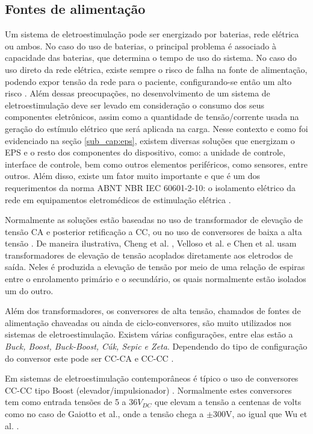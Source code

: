 \subsection{Fontes de alimentação}
Um sistema de eletroestimulação pode ser energizado por baterias, rede elétrica ou ambos. No caso do uso de baterias, o principal problema é associado à capacidade das baterias, que determina o tempo de uso do sistema. No caso do uso direto da rede elétrica, existe sempre o risco de falha na fonte de alimentação, podendo expor tensão da rede para o paciente, configurando-se então um alto risco \cite{Gaiotto2012}. Além dessas preocupações, no desenvolvimento de um sistema de eletroestimulação deve ser levado em consideração o consumo dos seus componentes eletrônicos, assim como a quantidade de tensão/corrente usada na geração do estímulo elétrico que será aplicada na carga. Nesse contexto e como foi evidenciado na seção \ref{sub_cap:eps}, existem diversas soluções que energizam o \acrshort{EPS} e o resto dos componentes do dispositivo, como: a unidade de controle, interface de controle, bem como outros elementos periféricos, como sensores, entre outros. Além disso, existe um fator muito importante e que é um dos requerimentos da norma \acrshort{ABNT} \acrshort{NBR} \acrshort{IEC} 60601-2-10: o isolamento elétrico da rede em equipamentos eletromédicos de estimulação elétrica \cite{Braz2003}. 

Normalmente as soluções estão baseadas no uso de transformador de elevação de tensão \acrshort{CA} e posterior retificação a \acrshort{CC}, ou no uso de conversores de baixa a alta tensão \cite{Cheng2004, KhosravaniSanaz2011, Kaczmarek1991}. De maneira ilustrativa, Cheng et al. \cite{Cheng2004}, Velloso et al. \cite{Velloso2007b} e Chen et al. \cite{Chen2013} usam transformadores de elevação de tensão acoplados diretamente aos eletrodos de saída. Neles é produzida a elevação de tensão por meio de uma relação de espiras entre o enrolamento primário e o secundário, os quais normalmente estão isolados um do outro.

Além dos transformadores, os conversores de alta tensão, chamados de fontes de alimentação chaveadas ou ainda de ciclo-conversores, são muito utilizados nos sistemas de eletroestimulação. Existem várias configurações, entre elas estão a \textit{Buck, Boost, Buck-Boost, Cúk, Sepic e Zeta}. Dependendo do tipo de configuração do conversor este pode ser CC-CA e CC-CC \cite{Ned2003}.

Em sistemas de eletroestimulação contemporâneos é típico o uso de conversores CC-CC tipo Boost (elevador/impulsionador) \cite{Faria2006, Wu2002, NacimentoJunqueira2003, Paredes2016}. Normalmente estes conversores tem como entrada tensões de 5 a 36$V_{DC}$ que elevam a tensão a centenas de volts como no caso de Gaiotto et al., onde a tensão chega a $\pm$300V, ao igual que Wu et al. \cite{Wu2002, Gaiotto2012}.

